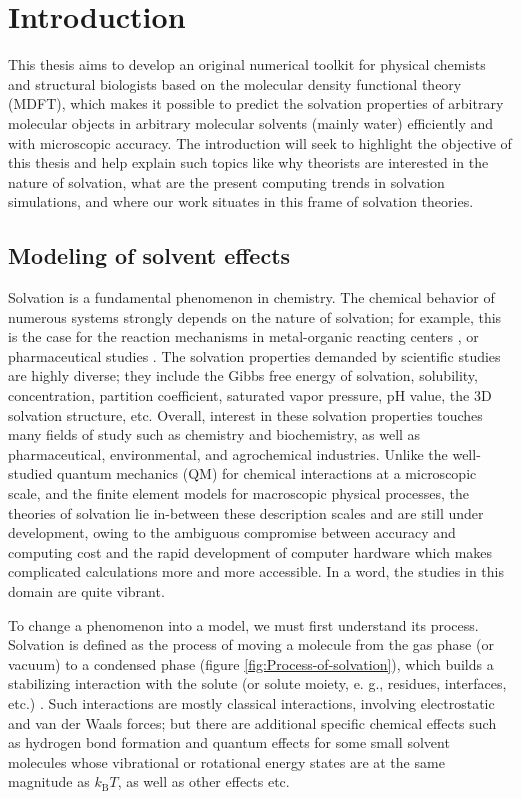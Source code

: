 
\chapter{Introduction\label{chpt:introduction}}

This thesis aims to develop an original numerical toolkit for physical
chemists and structural biologists based on the molecular density
functional theory (\acs{MDFT}), which makes it possible to predict
the solvation properties of arbitrary molecular objects in arbitrary
molecular solvents (mainly water) efficiently and with microscopic
accuracy. The introduction will seek to highlight the objective
of this thesis and help explain such topics like why theorists are interested in the
nature of solvation, what are the present computing trends in solvation
simulations, and where our work situates in this frame of solvation
theories.

\section{Modeling of solvent effects}

Solvation is a fundamental phenomenon in chemistry. The chemical behavior
of numerous systems strongly depends on the nature of solvation; for example, this
is the case for the reaction mechanisms in metal-organic
reacting centers \citep{Mn-oxo,PCET}, or pharmaceutical studies \citep{drug_1_Perlovich,drug_2_Perlovich,drug_3}.
The solvation properties demanded by scientific studies are highly
diverse; they include the Gibbs free energy of solvation,
solubility, concentration, partition coefficient, saturated vapor
pressure, pH value, the 3D solvation structure, etc. Overall,
interest in these solvation properties touches many fields of study
such as chemistry and biochemistry, as well as pharmaceutical, environmental,
and agrochemical industries. Unlike the well-studied quantum mechanics
(\acs{QM}) for chemical interactions at a microscopic scale, and
the finite element models for macroscopic physical processes, the
theories of solvation lie in-between these description scales and
are still under development, owing to the ambiguous compromise between
accuracy and computing cost and the rapid development of computer
hardware which makes complicated calculations more and more accessible.
In a word, the studies in this domain are quite vibrant.

To change a phenomenon into a model, we must first understand its
process. Solvation is defined as the process of moving a molecule
from the gas phase (or vacuum) to a condensed phase (figure \ref{fig:Process-of-solvation}),
which builds a stabilizing interaction with the solute (or solute
moiety, e. g., residues, interfaces, etc.) \citep{iupac}. Such interactions
are mostly classical interactions, involving electrostatic and van
der Waals forces; but there are additional specific chemical
effects such as hydrogen bond formation and quantum effects for some
small solvent molecules whose vibrational or rotational energy states
are at the same magnitude as $k_{\mathrm{B}}T$, as well as other effects
etc.


